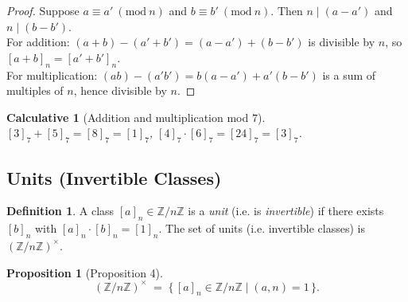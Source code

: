 \documentclass[12pt]{article}
\newtheorem{proposition}[theorem]{Proposition}
\newtheorem{calculative}[theorem]{Calculative}
\theoremstyle{definition}
\newtheorem{definition}{Definition}
\begin{document}
\vspace{1em}

\begin{proof}
Suppose $a\equiv a'\ (\mathrm{mod}\ n)$ and $b\equiv b'\ (\mathrm{mod}\ n)$. Then $n\mid(a-a')$ and $n\mid(b-b')$.  \\

\noindent
For addition: $(a+b)-(a'+b') = (a-a')+(b-b')$ is divisible by $n$, so $[a+b]_n = [a'+b']_n$.  \\

\noindent
For multiplication: $(ab)-(a'b') = b(a-a') + a'(b-b')$ is a sum of multiples of $n$, hence divisible by $n$.
\end{proof}

\dotfill

\begin{calculative}[Addition and multiplication mod $7$]
$[3]_7+[5]_7 = [8]_7 = [1]_7$,  
$[4]_7\cdot [6]_7 = [24]_7 = [3]_7$.
\end{calculative}

\newpage

\subsection*{Units (Invertible Classes)}

\begin{definition}
A class $[a]_n \in \mathbb{Z}/n\mathbb{Z}$ is a \emph{unit} (i.e. is \emph{invertible}) if there exists $[b]_n$ with $[a]_n\cdot [b]_n = [1]_n$.  
The set of units (i.e. invertible classes) is $(\mathbb{Z}/n\mathbb{Z})^\times$.
\end{definition}

\dotfill

\begin{proposition}[Proposition 4]
\[
(\mathbb{Z}/n\mathbb{Z})^\times \;=\; \{\, [a]_n \in \mathbb{Z}/n\mathbb{Z} \mid (a,n)=1 \,\}.
\]
\end{proposition}

\vspace{1em}
\end{document}
